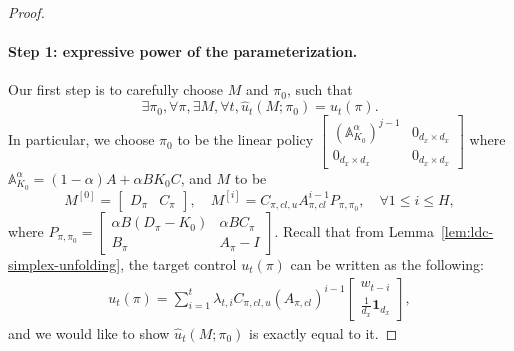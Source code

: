 \begin{proof}
\paragraph{Step 1: expressive power of the parameterization.} Our first step is to carefully choose $M$ and $\pi_0$, such that 
$$\exists \pi_0, \forall \pi, \exists M, \forall t, \hat{u}_t(M;\pi_0)=u_t(\pi).$$
In particular, we choose $\pi_0$ to be the linear policy $\begin{bmatrix}
\left(\mathbb{A}_{K_0}^{\alpha}\right)^{j-1} & 0_{d_x\times d_x}\\
0_{d_x\times d_x} & 0_{d_x\times d_x}
\end{bmatrix}$ where $\mathbb{A}_{K_0}^{\alpha}=(1-\alpha)A+\alpha B K_0 C$, and $M$ to be
$$
M^{[0]}=\begin{bmatrix}
D_{\pi} & C_{\pi}
\end{bmatrix}, \quad M^{[i]}=C_{\pi,cl,u} A_{\pi,cl}^{i-1} P_{\pi,\pi_0}, \quad \forall 1\le i \le H,
$$
where $P_{\pi,\pi_0} =\begin{bmatrix}
\alpha B(D_{\pi}-K_0) & \alpha B C_{\pi}\\
B_{\pi} & A_{\pi}-I
\end{bmatrix}$. Recall that from Lemma~\ref{lem:ldc-simplex-unfolding}, the target control $u_t(\pi)$ can be written as the following:
\begin{align*}
u_t(\pi)=\sum_{i=1}^t \lambda_{t,i} C_{\pi,cl,u} (A_{\pi,cl})^{i-1} \begin{bmatrix}
    w_{t-i} \\
    \frac{1}{d_x}\mathbf{1}_{d_x}
\end{bmatrix},
\end{align*}
and we would like to show $\hat{u}_t(M;\pi_0)$ is exactly equal to it.


\end{proof}
